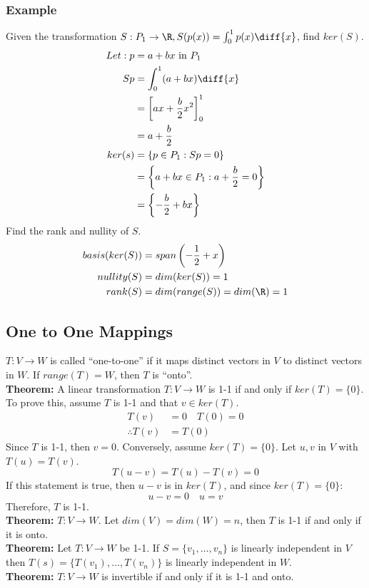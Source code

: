 \documentclass{math}
\begin{document}
\subsubsection*{Example}
Given the transformation \( S:P_1\to\R, S(p(x)) = \int_{0}^{1}p(x)\diff{x} \),
find \( ker(S) \).
\begin{align*}
  Let: p &= a+bx \text{ in } P_1 \\
  Sp &= \int_{0}^{1}(a+bx)\diff{x} \\
  &= \left[ax+\frac{b}{2}x^2\right]_{0}^{1} \\
  &= a+\frac{b}{2} \\
  ker(s) &= \{p\in P_1: Sp = 0 \} \\
  &= \left\{a+bx\in P_1: a+\frac{b}{2} = 0\right\} \\
  &= \left\{-\frac{b}{2}+bx\right\}
\end{align*}
Find the rank and nullity of \( S \).
\begin{align*}
  basis(ker(S)) &= span\left(-\frac{1}{2}+x\right) \\
  nullity(S) &= dim(ker(S)) = 1 \\
  rank(S) &= dim(range(S)) = dim(\R) = 1
\end{align*}

\subsection*{One to One Mappings}
\( T:V\to W \) is called ``one-to-one'' if it maps distinct vectors in \( V \)
to distinct vectors in \( W \). If \( range(T) = W \), then \( T \) is
``onto''. \\
\textbf{Theorem:} A linear transformation \( T:V\to W \) is 1-1 if and only if
\( ker(T) = \{0\} \). To prove this, assume \( T \) is 1-1 and that
\( v\in ker(T) \).
\begin{align*}
  T(v) &= 0 \quad T(0) = 0 \\
  \therefore T(v) &= T(0)
\end{align*}
Since \( T \) is 1-1, then \( v = 0 \). Conversely, assume \( ker(T) = \{0\} \).
Let \( u,v \) in \( V \) with \( T(u) = T(v) \).
\[ T(u-v) = T(u)-T(v) = 0 \]
If this statement is true, then \( u-v \) is in \( ker(T) \), and since
\( ker(T) = \{0\} \):
\[ u-v = 0 \quad u = v \]
Therefore, \( T \) is 1-1. \\
\textbf{Theorem:} \( T:V\to W \). Let \( dim(V) = dim(W) = n \), then \( T \) is
1-1 if and only if it is onto. \\
\textbf{Theorem:} Let \( T:V\to W \) be 1-1. If \( S = \{v_1,\dots,v_n\} \) is
linearly independent in \( V \) then \( T(s) = \{T(v_1),\dots,T(v_n)\} \) is
linearly independent in \( W \). \\
\textbf{Theorem:} \( T:V\to W \) is invertible if and only if it is 1-1 and
onto.
\end{document}
